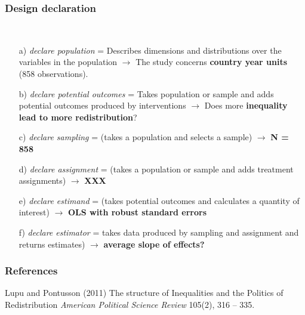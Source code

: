 \documentclass{beamer}
\begin{document}
\begin{frame}
\frametitle{Design declaration}\
\begin{itemize}
\item[a)] \textit{declare population} = Describes dimensions and distributions over the variables in the population  $\longrightarrow$ The study concerns\textbf{ country year units} (858 observations).
\item[b)] \textit{declare potential outcomes} = Takes population or sample and adds potential outcomes produced by interventions $\longrightarrow$ Does more \textbf{inequality lead to more redistribution}?  
\item[c)] \textit{declare sampling} = (takes a population and selects a sample)  $\longrightarrow$ \textbf{N = 858}
\item[d)] \textit{declare assignment} = (takes a population or sample and adds treatment assignments)  $\longrightarrow$ \textbf{XXX}
\item[e)]\textit{declare estimand} = (takes potential outcomes and calculates a quantity of interest) $\longrightarrow$ \textbf{OLS with robust standard errors}
\item[f)]\textit{declare estimator} = takes data produced by sampling and assignment and returns estimates) $\longrightarrow$ \textbf{average slope of effects?}
\end{itemize}
\end{frame}
\begin{frame}
\frametitle{References}
\footnotesize{
\begin{thebibliography}{99}
 Lupu and Pontusson (2011)
\newblock The structure of Inequalities and the Politics of Redistribution
\newblock \emph{American Political Science Review} 105(2), 316 -- 335.

\end{thebibliography}
}
\end{frame}
\end{document}
